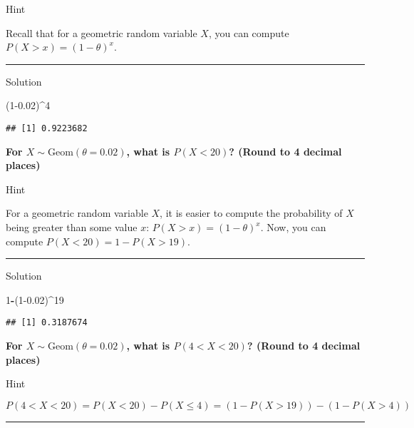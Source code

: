 \documentclass[
]{book}
\newenvironment{Shaded}{\begin{snugshade}}{\end{snugshade}}
\newcommand{\DecValTok}[1]{\textcolor[rgb]{0.00,0.00,0.81}{#1}}
\newcommand{\FloatTok}[1]{\textcolor[rgb]{0.00,0.00,0.81}{#1}}
\newcommand{\NormalTok}[1]{#1}
\newcommand{\SpecialCharTok}[1]{\textcolor[rgb]{0.81,0.36,0.00}{\textbf{#1}}}
\begin{document}
Hint

Recall that for a geometric random variable \(X\), you can compute \(P(X>x)=(1-\theta)^{x}\).

\begin{center}\rule{0.5\linewidth}{0.5pt}\end{center}

Solution

\begin{Shaded}
\begin{Highlighting}[]
\NormalTok{(}\DecValTok{1}\FloatTok{{-}0.02}\NormalTok{)}\SpecialCharTok{\^{}}\DecValTok{4}
\end{Highlighting}
\end{Shaded}

\begin{verbatim}
## [1] 0.9223682
\end{verbatim}

\textbf{For \(X \sim \mbox{Geom}(\theta=0.02)\), what is \(P(X<20)\)? (Round to 4 decimal places)}

Hint

For a geometric random variable \(X\), it is easier to compute the probability of \(X\) being greater than some value \(x\): \(P(X>x)=(1-\theta)^{x}\). Now, you can compute \(P(X<20)=1-P(X>19)\).

\begin{center}\rule{0.5\linewidth}{0.5pt}\end{center}

Solution

\begin{Shaded}
\begin{Highlighting}[]
\DecValTok{1}\SpecialCharTok{{-}}\NormalTok{(}\DecValTok{1}\FloatTok{{-}0.02}\NormalTok{)}\SpecialCharTok{\^{}}\DecValTok{19}
\end{Highlighting}
\end{Shaded}

\begin{verbatim}
## [1] 0.3187674
\end{verbatim}

\textbf{For \(X \sim \mbox{Geom}(\theta=0.02)\), what is \(P(4<X<20)\)? (Round to 4 decimal places)}

Hint

\(P(4<X<20)=P(X<20)-P(X \leq 4)=(1-P(X>19))-(1-P(X>4))\)

\begin{center}\rule{0.5\linewidth}{0.5pt}\end{center}
\end{document}
